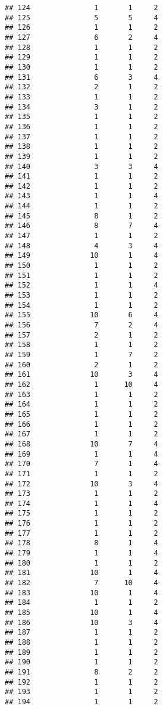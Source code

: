 \documentclass[
]{article}
\begin{document}
\begin{verbatim}
## 124               1       1     2
## 125               5       5     4
## 126               1       1     2
## 127               6       2     4
## 128               1       1     2
## 129               1       1     2
## 130               1       1     2
## 131               6       3     4
## 132               2       1     2
## 133               1       1     2
## 134               3       1     2
## 135               1       1     2
## 136               1       1     2
## 137               1       1     2
## 138               1       1     2
## 139               1       1     2
## 140               3       3     4
## 141               1       1     2
## 142               1       1     2
## 143               1       1     4
## 144               1       1     2
## 145               8       1     2
## 146               8       7     4
## 147               1       1     2
## 148               4       3     4
## 149              10       1     4
## 150               1       1     2
## 151               1       1     2
## 152               1       1     4
## 153               1       1     2
## 154               1       1     2
## 155              10       6     4
## 156               7       2     4
## 157               2       1     2
## 158               1       1     2
## 159               1       7     2
## 160               2       1     2
## 161              10       3     4
## 162               1      10     4
## 163               1       1     2
## 164               1       1     2
## 165               1       1     2
## 166               1       1     2
## 167               1       1     2
## 168              10       7     4
## 169               1       1     4
## 170               7       1     4
## 171               1       1     2
## 172              10       3     4
## 173               1       1     2
## 174               1       1     4
## 175               1       1     2
## 176               1       1     2
## 177               1       1     2
## 178               8       1     4
## 179               1       1     4
## 180               1       1     2
## 181              10       1     4
## 182               7      10     4
## 183              10       1     4
## 184               1       1     2
## 185              10       1     4
## 186              10       3     4
## 187               1       1     2
## 188               1       1     2
## 189               1       1     2
## 190               1       1     2
## 191               8       2     2
## 192               1       1     2
## 193               1       1     2
## 194               1       1     2

\end{verbatim}
\end{document}

